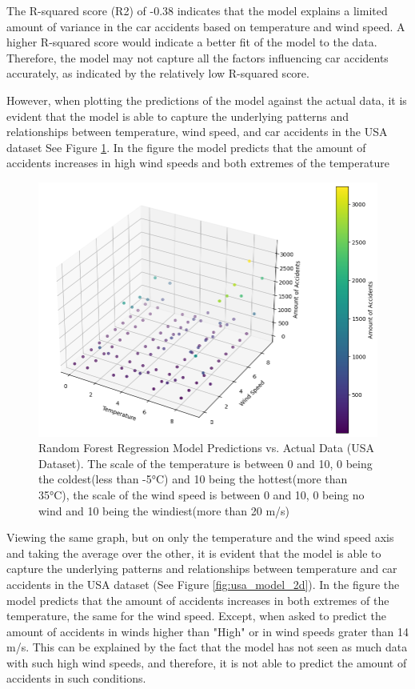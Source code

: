 \documentclass{article}
\begin{document}
The R-squared score (R2) of -0.38 indicates that the model explains a limited amount of variance in the car accidents based on temperature and wind speed. A higher R-squared score would indicate a better fit of the model to the data. Therefore, the model may not capture all the factors influencing car accidents accurately, as indicated by the relatively low R-squared score.

However, when plotting the predictions of the model against the actual data, it is evident that the model is able to capture the underlying patterns and relationships between temperature, wind speed, and car accidents in the USA dataset See Figure \ref{fig:usa_model}. In the figure the model predicts that the amount of accidents increases in high wind speeds and both extremes of the temperature

\begin{figure}
    \centering
    \includegraphics[scale=0.5]{../figures/highres/usa_model.png}
    \caption{Random Forest Regression Model Predictions vs. Actual Data (USA Dataset). The scale of the temperature is between 0 and 10, 0 being the coldest(less than -5°C) and 10 being the hottest(more than 35°C), the scale of the wind speed is between 0 and 10, 0 being no wind and 10 being the windiest(more than 20 m/s)}
    \label{fig:usa_model}
\end{figure}

Viewing the same graph, but on only the temperature  and the wind speed axis and taking the average over the other, it is evident that the model is able to capture the underlying patterns and relationships between temperature and car accidents in the USA dataset (See Figure \ref{fig:usa_model_2d}). In the figure the model predicts that the amount of accidents increases in both extremes of the temperature, the same for the wind speed. Except, when asked to predict the amount of accidents in winds higher than "High" or in wind speeds grater than 14 m/s. This can be explained by the fact that the model has not seen as much data with such high wind speeds, and therefore, it is not able to predict the amount of accidents in such conditions.
\end{document}
